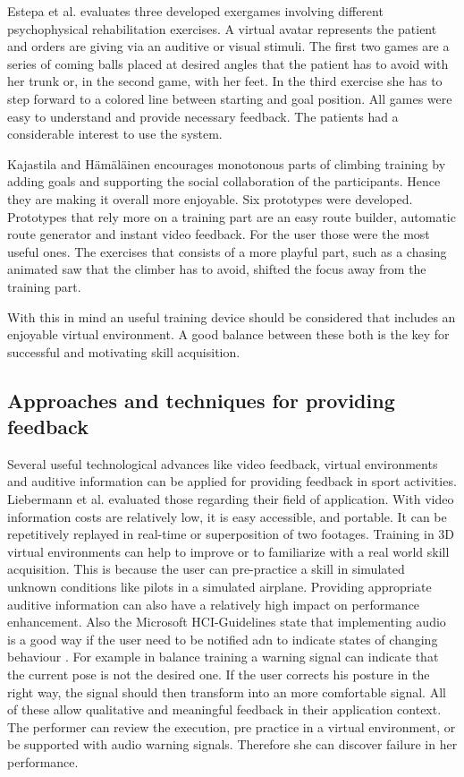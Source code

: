Estepa et al. \cite{Estepa2016-oj} evaluates three developed exergames involving different psychophysical rehabilitation exercises. A virtual avatar represents the patient and orders are giving via an auditive or visual stimuli. The first two games are a series of coming balls placed at desired angles that the patient has to avoid with her trunk or, in the second game, with her feet. In the third exercise she has to step forward to a colored line between starting and goal position. All games were easy to understand and provide necessary feedback. The patients had a considerable interest to use the system.

Kajastila and Hämäläinen \cite{Kajastila2014-ug} encourages monotonous parts of climbing training by adding goals and supporting the social collaboration of the participants. Hence they are making it overall more enjoyable. Six prototypes were developed. Prototypes that rely more on a training part are an easy route builder, automatic route generator and instant video feedback. For the user those were the most useful ones. The exercises that consists of a more playful part, such as a chasing animated saw that the climber has to avoid, shifted the focus away from the training part. 

With this in mind an useful training device should be considered that includes an enjoyable virtual environment. A good balance between these both is the key for successful and motivating skill acquisition.

\subsection{Approaches and techniques for providing feedback}

Several  useful technological advances like video feedback, virtual environments and auditive information can be applied for providing feedback in sport activities. Liebermann et al. \cite{Liebermann2002-zr} evaluated those regarding their field of application. With video information costs are relatively low, it is easy accessible, and portable. It can be repetitively replayed in real-time or superposition of two footages. Training in 3D virtual environments can help to improve or to familiarize with a real world skill acquisition. This is because the user can pre-practice a skill in simulated unknown conditions like pilots in a simulated airplane. Providing appropriate auditive information can also have a relatively high impact on performance enhancement. Also the Microsoft HCI-Guidelines state that implementing audio  is a good way if the user need to be notified adn to indicate states of changing behaviour \cite{MicrosoftHIG2014-mh}. For example in balance training a warning signal can indicate that the current pose is not the desired one. If the user corrects his posture in the right way, the signal should then transform into an more comfortable signal. All of these allow qualitative and meaningful feedback in their application context. The performer can review the execution, pre practice in a virtual environment, or be supported with audio warning signals. Therefore she can discover failure in her performance.

